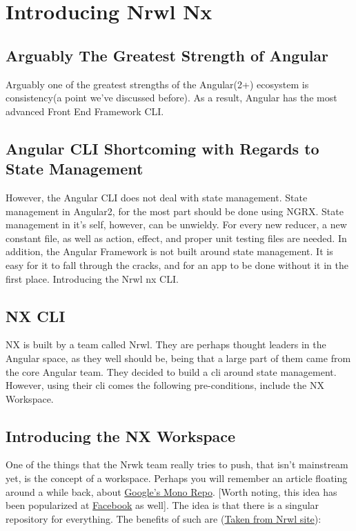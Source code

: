 \maketitle{}
\section{Introducing Nrwl Nx}

\subsection{Arguably The Greatest Strength of Angular}

Arguably one of the greatest strengths of the Angular(2+) ecosystem is
consistency(a point we've discussed before). As a result, Angular has the most
advanced Front End Framework CLI.

\subsection{Angular CLI Shortcoming with Regards to State Management}

However, the Angular CLI does not deal with state management. State management
in Angular2, for the most part should be done using NGRX. State management in
it's self, however, can be unwieldy. For every new reducer, a new constant file,
as well as action, effect, and proper unit testing files are needed.
In addition, the Angular Framework is not built around state management. It is
easy for it to fall through the cracks, and for an app to be done without it in
the first place. Introducing the Nrwl nx CLI.

\subsection{NX CLI}
NX is built by a team called Nrwl. They are perhaps thought leaders in the
Angular space, as they well should be, being that a large part of them came
from the core Angular team. They decided to build a cli around state management.
However, using their cli comes the following pre-conditions, include the NX
Workspace.

\subsection{Introducing the NX Workspace}
One of the things that the Nrwk team really tries to push, that isn't mainstream
yet, is the concept of a workspace. Perhaps you will remember an article
floating around a while back, about
\href{https://cacm.acm.org/magazines/2016/7/204032-why-google-stores-billions-of-lines-of-code-in-a-single-repository/fulltext}
{Google's Mono Repo}. [Worth noting, this idea
has been popularized at
\href{https://code.facebook.com/posts/218678814984400/scaling-mercurial-at-facebook/}{Facebook}
as well]. The idea is that there is a singular repository for everything.
The benefits of such are
(\href{https://nrwl.io/nx/why-a-workspace}{Taken from Nrwl site}):

